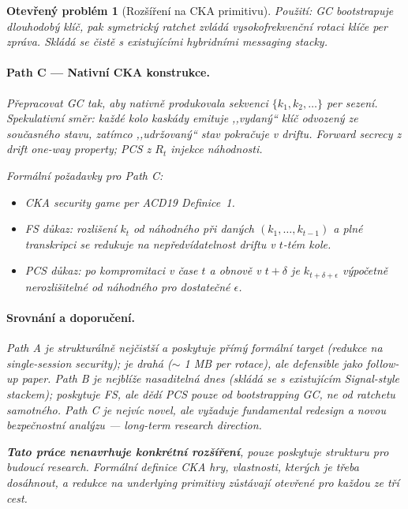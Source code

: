\documentclass[11pt,a4paper]{article}
\newtheorem{openproblem}{Otev\v{r}en\'y probl\'em}
\begin{document}
\begin{openproblem}[Rozšíření na CKA primitivu]
\emph{Použití:} GC bootstrapuje dlouhodobý klíč, pak symetrický ratchet zvládá vysokofrekvenční rotaci klíče per zpráva. Skládá se čistě s existujícími hybridními messaging stacky.

\paragraph{Path C --- Nativní CKA konstrukce.}
Přepracovat GC tak, aby nativně produkovala sekvenci $\{k_1, k_2, \ldots\}$ per sezení. Spekulativní směr: každé kolo kaskády emituje ,,vydaný`` klíč odvozený ze současného stavu, zatímco ,,udržovaný`` stav pokračuje v driftu. Forward secrecy z drift one-way property; PCS z $R_t$ injekce náhodnosti.

\emph{Formální požadavky pro Path C:}
\begin{itemize}[leftmargin=*]
\item CKA security game per ACD19 Definice~1.
\item FS důkaz: rozlišení $k_t$ od náhodného při daných $(k_1, \ldots, k_{t-1})$ a plné transkripci se redukuje na nepředvídatelnost driftu v $t$-tém kole.
\item PCS důkaz: po kompromitaci v čase $t$ a obnově v $t+\delta$ je $k_{t+\delta+\epsilon}$ výpočetně nerozlišitelné od náhodného pro dostatečné $\epsilon$.
\end{itemize}

\paragraph{Srovnání a doporučení.}
Path A je strukturálně nejčistší a poskytuje přímý formální target (redukce na single-session security); je drahá ($\sim$ 1 MB per rotace), ale defensible jako follow-up paper. Path B je nejblíže nasaditelná dnes (skládá se s existujícím Signal-style stackem); poskytuje FS, ale dědí PCS pouze od bootstrapping GC, ne od ratchetu samotného. Path C je nejvíc novel, ale vyžaduje fundamental redesign a novou bezpečnostní analýzu --- long-term research direction.

\textbf{Tato práce nenavrhuje konkrétní rozšíření}, pouze poskytuje strukturu pro budoucí research. Formální definice CKA hry, vlastnosti, kterých je třeba dosáhnout, a redukce na underlying primitivy zůstávají otevřené pro každou ze tří cest.
\end{openproblem}
\end{document}

